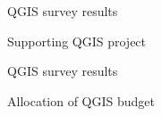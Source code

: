 \begin{frame}{QGIS survey results}
	\begin{block}{Supporting QGIS project}
	\end{block}
\end{frame}

\begin{frame}{QGIS survey results}
	\begin{block}{Allocation of QGIS budget}
	\end{block}
\end{frame}